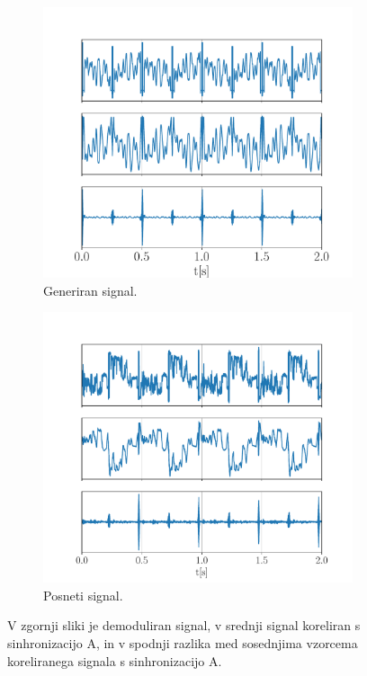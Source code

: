 \documentclass{article}
\begin{document}
\begin{figure}[H]
    \centering
    \begin{subfigure}[b]{0.49\textwidth}
        \centering
        \includegraphics[width=\textwidth]{penguin_corr.pdf}
        \caption{Generiran signal.}
    \end{subfigure}
    \hfill
    \begin{subfigure}[b]{0.49\textwidth}
        \centering
        \includegraphics[width=\textwidth]{argentina_corr.pdf}
        \caption{Posneti signal.}
    \end{subfigure}

	\caption{V zgornji sliki je demoduliran signal, v srednji signal koreliran s sinhronizacijo A, in v spodnji razlika med sosednjima vzorcema koreliranega signala s sinhronizacijo A.}
    \label{fig:sync_corr}
\end{figure}
\end{document}
